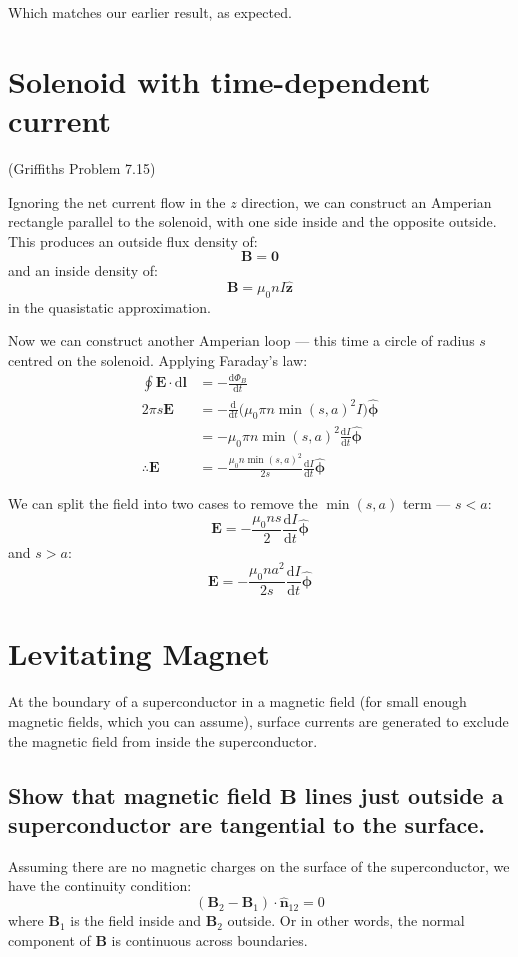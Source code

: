 \documentclass[a4paper]{scrartcl}
\begin{document}
Which matches our earlier result, as expected.

\section{Solenoid with time-dependent current}
(Griffiths Problem 7.15)

Ignoring the net current flow in the \(z\) direction, we can construct an Amperian rectangle parallel to the solenoid, with one side inside and the opposite outside. This produces an outside flux density of:
\[\mathbf{B} = \mathbf{0}\]
and an inside density of:
\[\mathbf{B} = \mu_0 n I \hat{\mathbf{z}}\]
in the quasistatic approximation.

Now we can construct another Amperian loop --- this time a circle of radius \(s\) centred on the solenoid. Applying Faraday's law:
\begin{align*}
    \oint \mathbf{E} \cdot \mathrm{d}\mathbf{l} &= -\frac{\mathrm{d}\Phi_B}{\mathrm{d}t} \\
    2 \pi s \mathbf{E} &= -\frac{\mathrm{d}}{\mathrm{d}t}\bigg(\mu_0 \pi n \min(s, a)^2 I\bigg) \hat{\boldsymbol{\phi}} \\
    &= -\mu_0 \pi n \min(s, a)^2 \frac{\mathrm{d}I}{\mathrm{d}t} \hat{\boldsymbol{\phi}} \\
    \therefore \mathbf{E} &= -\frac{\mu_0 n \min(s, a)^2}{2 s} \frac{\mathrm{d}I}{\mathrm{d}t} \hat{\boldsymbol{\phi}}
\end{align*}

We can split the field into two cases to remove the \(\min(s, a)\) term --- \(s < a\):
\[\mathbf{E} = -\frac{\mu_0 n s}{2} \frac{\mathrm{d}I}{\mathrm{d}t} \hat{\boldsymbol{\phi}}\]
and \(s > a\):
\[\mathbf{E} = -\frac{\mu_0 n a^2}{2 s} \frac{\mathrm{d}I}{\mathrm{d}t} \hat{\boldsymbol{\phi}}\]

\section{Levitating Magnet}
At the boundary of a superconductor in a magnetic field (for small enough magnetic fields, which you can assume), surface currents are generated to exclude the magnetic field from inside the superconductor.

\subsection{Show that magnetic field \(\mathbf{B}\) lines just outside a superconductor are tangential to the surface.}
Assuming there are no magnetic charges on the surface of the superconductor, we have the continuity condition:
\[(\mathbf{B}_2 - \mathbf{B}_1) \cdot \hat{\mathbf{n}}_{12} = 0\]
where \(\mathbf{B}_1\) is the field inside and \(\mathbf{B}_2\) outside. Or in other words, the normal component of \(\mathbf{B}\) is continuous across boundaries.
\end{document}
